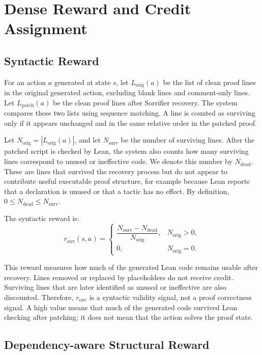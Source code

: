 \chapter{Dense Reward and Credit Assignment}
\label{sec:reward}

\section{Syntactic Reward}
\label{subsec:syntactic-reward}

For an action \(a\) generated at state \(s\), let \(L_{\text{orig}}(a)\) be the list of clean proof lines in
the original generated action, excluding blank lines and comment-only lines. Let \(L_{\text{patch}}(a)\)
be the clean proof lines after Sorrifier recovery. The system compares these two lists using sequence
matching. A line is counted as surviving only if it appears unchanged and in the same relative order in
the patched proof.

Let \(N_{\text{orig}} = |L_{\text{orig}}(a)|\), and let \(N_{\text{surv}}\) be the number of surviving lines.
After the patched script is checked by Lean, the system also counts how many surviving lines correspond
to unused or ineffective code. We denote this number by \(N_{\text{dead}}\). These are lines that survived
the recovery process but do not appear to contribute useful executable proof structure, for example
because Lean reports that a declaration is unused or that a tactic has no effect. By definition,
\(0 \leq N_{\text{dead}} \leq N_{\text{surv}}\).

The syntactic reward is:
\[
r_{\mathrm{env}}(s,a) =
\begin{cases}
\dfrac{N_{\text{surv}} - N_{\text{dead}}}{N_{\text{orig}}},
& N_{\text{orig}} > 0, \\
0, & N_{\text{orig}} = 0.
\end{cases}
\]

This reward measures how much of the generated Lean code remains usable after recovery. Lines removed
or replaced by placeholders do not receive credit. Surviving lines that are later identified as unused or
ineffective are also discounted. Therefore, \(r_{\mathrm{env}}\) is a syntactic validity signal, not a proof
correctness signal. A high value means that much of the generated code survived Lean checking after patching; 
it does not mean that the action solves the proof state.

\section{Dependency-aware Structural Reward}
\label{subsec:dep-reward}

